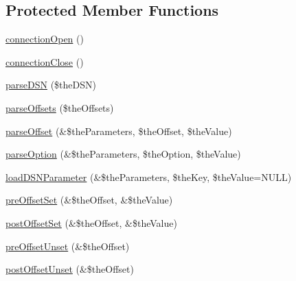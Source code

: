 \subsection*{Protected Member Functions}
\begin{DoxyCompactItemize}
\item 
\hyperlink{class_ontology_wrapper_1_1_connection_object_a8533629374db92c93b6500c5cd7b89fa}{connection\-Open} ()
\item 
\hyperlink{class_ontology_wrapper_1_1_connection_object_aa355abbd5de052f9587296c68dd98ee4}{connection\-Close} ()
\item 
\hyperlink{class_ontology_wrapper_1_1_connection_object_a3b5e9ba7510b52d1f3f3cb1971491c53}{parse\-D\-S\-N} (\$the\-D\-S\-N)
\item 
\hyperlink{class_ontology_wrapper_1_1_connection_object_aa9e833d63b5ba46bb694292e3cd7e957}{parse\-Offsets} (\$the\-Offsets)
\item 
\hyperlink{class_ontology_wrapper_1_1_connection_object_ad346cdcd5a06513ed3ae434791f9b027}{parse\-Offset} (\&\$the\-Parameters, \$the\-Offset, \$the\-Value)
\item 
\hyperlink{class_ontology_wrapper_1_1_connection_object_a25920bb50adac434b6e43b5702a85a84}{parse\-Option} (\&\$the\-Parameters, \$the\-Option, \$the\-Value)
\item 
\hyperlink{class_ontology_wrapper_1_1_connection_object_ac0e6ea1c27ccfbf1366f8c6ab8c830c7}{load\-D\-S\-N\-Parameter} (\&\$the\-Parameters, \$the\-Key, \$the\-Value=N\-U\-L\-L)
\item 
\hyperlink{class_ontology_wrapper_1_1_connection_object_a4cd98d80db32b7bddfe1e46c0239b9e0}{pre\-Offset\-Set} (\&\$the\-Offset, \&\$the\-Value)
\item 
\hyperlink{class_ontology_wrapper_1_1_connection_object_aed704c5a7f4abb5eaa96123b4c889409}{post\-Offset\-Set} (\&\$the\-Offset, \&\$the\-Value)
\item 
\hyperlink{class_ontology_wrapper_1_1_connection_object_a5d8ba718e827507c25aedda8af50d235}{pre\-Offset\-Unset} (\&\$the\-Offset)
\item 
\hyperlink{class_ontology_wrapper_1_1_connection_object_a10e24985e878fe6a15c40dcaf266e3c2}{post\-Offset\-Unset} (\&\$the\-Offset)
\end{DoxyCompactItemize}

